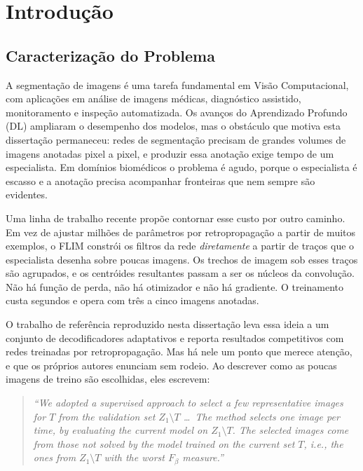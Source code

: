 \chapter[Introdução]{Introdução}
\label{cap_1}

\section{Caracterização do Problema}

A segmentação de imagens é uma tarefa fundamental em Visão Computacional, com aplicações em análise de imagens médicas, diagnóstico assistido, monitoramento e inspeção automatizada. Os avanços do Aprendizado Profundo (\ac{DL}) ampliaram o desempenho dos modelos, mas o obstáculo que motiva esta dissertação permaneceu: redes de segmentação precisam de grandes volumes de imagens anotadas pixel a pixel, e produzir essa anotação exige tempo de um especialista. Em domínios biomédicos o problema é agudo, porque o especialista é escasso e a anotação precisa acompanhar fronteiras que nem sempre são evidentes.

Uma linha de trabalho recente propõe contornar esse custo por outro caminho. Em vez de ajustar milhões de parâmetros por retropropagação a partir de muitos exemplos, o \ac{FLIM} \cite{souza2020flim,benato2020cnnmarkers} constrói os filtros da rede \emph{diretamente} a partir de traços que o especialista desenha sobre poucas imagens. Os trechos de imagem sob esses traços são agrupados, e os centróides resultantes passam a ser os núcleos da convolução. Não há função de perda, não há otimizador e não há gradiente. O treinamento custa segundos e opera com três a cinco imagens anotadas.

O trabalho de referência reproduzido nesta dissertação \cite{soares2026flim} leva essa ideia a um conjunto de decodificadores adaptativos e reporta resultados competitivos com redes treinadas por retropropagação. Mas há nele um ponto que merece atenção, e que os próprios autores enunciam sem rodeio. Ao descrever como as poucas imagens de treino são escolhidas, eles escrevem:

\begin{quote}
\emph{``We adopted a supervised approach to select a few representative images for $T$ from the validation set $Z_1 \setminus T$ \ldots\ The method selects one image per time, by evaluating the current model on $Z_1 \setminus T$. The selected images come from those not solved by the model trained on the current set $T$, i.e., the ones from $Z_1 \setminus T$ with the worst $F_\beta$ measure.''} \cite{soares2026flim}
\end{quote}

